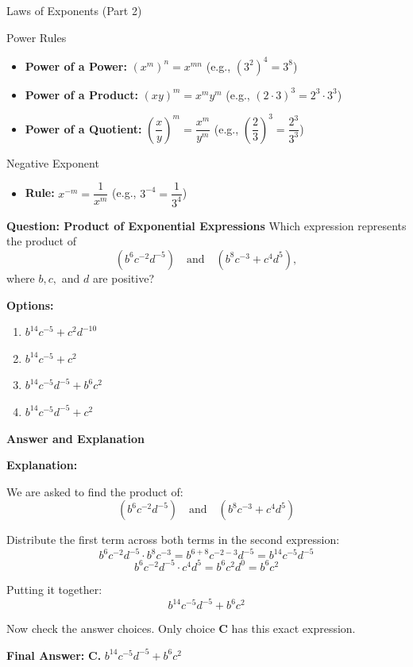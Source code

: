 \documentclass{beamer}
\begin{document}
\begin{frame}{Laws of Exponents (Part 2)}

\begin{block}{Power Rules}

\begin{itemize}
    \item \textbf{Power of a Power:} \quad $(x^m)^n = x^{mn}$ \hfill (e.g., $(3^2)^4 = 3^8$)
    \item \textbf{Power of a Product:} \quad $(xy)^m = x^m y^m$ \hfill (e.g., $(2 \cdot 3)^3 = 2^3 \cdot 3^3$)
    \item \textbf{Power of a Quotient:} \quad $\left(\dfrac{x}{y}\right)^m = \dfrac{x^m}{y^m}$ \hfill (e.g., $\left(\dfrac{2}{3}\right)^3 = \dfrac{2^3}{3^3}$)
\end{itemize}
\end{block}

\begin{block}{Negative Exponent}

\begin{itemize}
    \item \textbf{Rule:} \quad $x^{-m} = \dfrac{1}{x^m}$ \hfill (e.g., $3^{-4} = \dfrac{1}{3^4}$)
\end{itemize}
\end{block}

\end{frame}

\begin{frame}{\textbf{Question: Product of Exponential Expressions}}
Which expression represents the product of 
\[
(b^6 c^{-2} d^{-5}) \quad \text{and} \quad (b^8 c^{-3}+c^4 d^5),
\]
where \( b, c, \) and \( d \) are positive?

\vspace{0.5em}
\textbf{Options:}
\begin{enumerate}
    \item[A.] \( b^{14} c^{-5} + c^2 d^{-10} \)
    \item[B.] \( b^{14} c^{-5} + c^2 \)
    \item[C.] \( b^{14} c^{-5} d^{-5} + b^6 c^2 \)
    \item[D.] \( b^{14} c^{-5} d^{-5} + c^2 \)
\end{enumerate}
\end{frame}


\begin{frame}{\textbf{Answer and Explanation}}


\textbf{Explanation:}

We are asked to find the product of:
\[
(b^6 c^{-2} d^{-5}) \quad \text{and} \quad (b^8 c^{-3} + c^4 d^5)
\]

Distribute the first term across both terms in the second expression:
\[
b^6 c^{-2} d^{-5} \cdot b^8 c^{-3} = b^{6+8} c^{-2-3} d^{-5} = b^{14} c^{-5} d^{-5}
\]
\[
b^6 c^{-2} d^{-5} \cdot c^4 d^5 = b^6 c^{2} d^{0} = b^6 c^2
\]

Putting it together:
\[
b^{14} c^{-5} d^{-5} + b^6 c^2
\]

Now check the answer choices. Only choice \textbf{C} has this exact expression.

\textbf{Final Answer:} \textbf{C.} \( b^{14} c^{-5} d^{-5} + b^6 c^2 \)
\end{frame}
\end{document}
